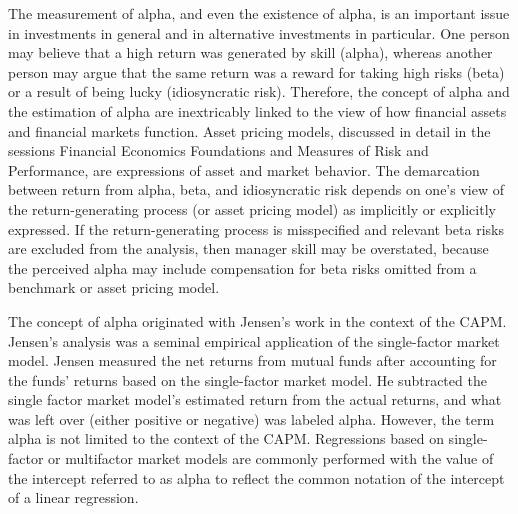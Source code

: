 \documentclass[11pt]{article}
\begin{document}
The measurement of alpha, and even the existence of alpha, is an important issue in investments in general and in alternative investments in particular. One person may believe that a high return was generated by skill (alpha), whereas another person may argue that the same return was a reward for taking high risks (beta) or a result of being lucky (idiosyncratic risk). Therefore, the concept of alpha and the estimation of alpha are inextricably linked to the view of how financial assets and financial markets function. Asset pricing models, discussed in detail in the sessions Financial Economics Foundations and Measures of Risk and Performance, are expressions of asset and market behavior. The demarcation between return from alpha, beta, and idiosyncratic risk depends on one's view of the return-generating process (or asset pricing model) as implicitly or explicitly expressed. If the return-generating process is misspecified and relevant beta risks are excluded from the analysis, then manager skill may be overstated, because the perceived alpha may include compensation for beta risks omitted from a benchmark or asset pricing model.

The concept of alpha originated with Jensen's work in the context of the CAPM. Jensen's analysis was a seminal empirical application of the single-factor market model. Jensen measured the net returns from mutual funds after accounting for the funds' returns based on the single-factor market model. He subtracted the single factor market model's estimated return from the actual returns, and what was left over (either positive or negative) was labeled alpha. However, the term alpha is not limited to the context of the CAPM. Regressions based on single-factor or multifactor market models are commonly performed with the value of the intercept referred to as alpha to reflect the common notation of the intercept of a linear regression.
\end{document}
